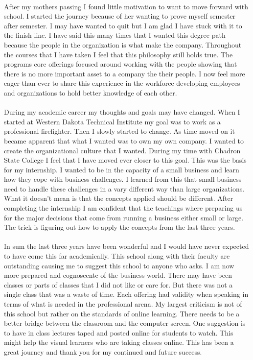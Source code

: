 \documentclass[12pt,titlepage]{article}
\begin{document}
\paragraph {}
After my mothers passing I found little motivation to want to move forward with school. I started the journey because of her wanting to prove myself semester after semester. I may have wanted to quit but I am glad I have stuck with it to the finish line. I have said this many times that I wanted this degree path because the people in the organization is what make the company. Throughout the courses that I have taken I feel that this philosophy still holds true. The programs core offerings focused around working with the people showing that there is no more important asset to a company the their people. I now feel more eager than ever to share this experience in the workforce developing employees and organizations to hold better knowledge of each other.
\paragraph {}
During my academic career my thoughts and goals may have changed. When I started at Western Dakota Technical Institute my goal was to work as a professional firefighter. Then I slowly started to change. As time moved on it became apparent that what I wanted was to own my own company. I wanted to create the organizational culture that I wanted. During my time with Chadron State College I feel that I have moved ever closer to this goal. This was the basis for my internship. I wanted to be in the capacity of a small business and learn how they cope with business challenges. I learned from this that small business need to handle these challenges in a vary different way than large organizations. What it doesn't mean is that the concepts applied should be different. After completing the internship I am confident that the teachings where preparing us for the major decisions that come from running a business either small or large. The trick is figuring out how to apply the concepts from the last three years.
\paragraph {}
In sum the last three years have been wonderful and I would have never expected to have come this far academically. This school along with their faculty are outstanding causing me to suggest this school to anyone who asks. I am now more prepared and cognoscente of the business world. There may have been classes or parts of classes that I did not like or care for. But there was not a single class that was a waste of time. Each offering had validity when speaking in terms of what is needed in the professional arena. My largest criticism is not of this school but rather on the standards of online learning. There needs to be a better bridge between the classroom and the computer screen. One suggestion is to have in class lectures taped and posted online for students to watch. This might help the visual learners who are taking classes online. This has been a great journey and thank you for my continued and future success.
\end{document}
